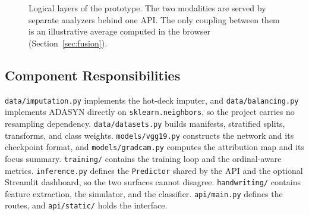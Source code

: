 \documentclass[conference]{IEEEtran}
\begin{document}
\begin{figure}[t]
\centering
{}
\caption{Logical layers of the prototype. The two modalities are served by separate analyzers behind one API. The only coupling between them is an illustrative average computed in the browser (Section~\ref{sec:fusion}).}
\label{fig:layers}
\end{figure}

\subsection{Component Responsibilities}
\texttt{data/imputation.py} implements the hot-deck imputer, and \texttt{data/balancing.py} implements ADASYN directly on \texttt{sklearn.neighbors}, so the project carries no resampling dependency. \texttt{data/datasets.py} builds manifests, stratified splits, transforms, and class weights. \texttt{models/vgg19.py} constructs the network and its checkpoint format, and \texttt{models/gradcam.py} computes the attribution map and its focus summary. \texttt{training/} contains the training loop and the ordinal-aware metrics. \texttt{inference.py} defines the \texttt{Predictor} shared by the API and the optional Streamlit dashboard, so the two surfaces cannot disagree. \texttt{handwriting/} contains feature extraction, the simulator, and the classifier. \texttt{api/main.py} defines the routes, and \texttt{api/static/} holds the interface.
\end{document}
